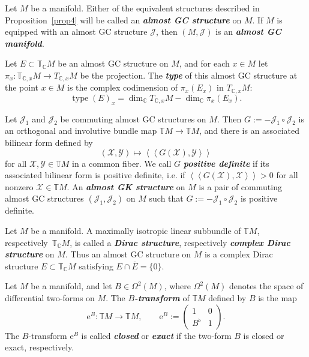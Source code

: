 \documentclass[pdftex]{sigma}
\numberwithin{equation}{section}
\newcommand{\deff}[1]{\textbf{\emph{#1}}}
\newcommand{\func}[3]{#1 \colon #2 \to #3}
\newcommand{\pont}[1]{\mathbb{T} {#1}}
\newcommand{\cpont}[1]{\mathbb{T}_{\mathbb{C}} {#1}}
\newcommand{\tang}{T}
\newcommand{\iiprod}[2]{\left\langle \! \left\langle {#1} , {#2} \right\rangle \! \right\rangle}
\begin{document}
\begin{Definition}
Let $M$ be a manifold.  Either of the equivalent structures described in Proposition~\ref{prop4} will be called an \deff{almost GC structure} on $M$.  If $M$ is equipped with an almost GC structure $\mathcal{J}$, then $(M,\mathcal{J})$ is an \deff{almost GC manifold}.

Let $E \subset \cpont{M}$ be an almost GC structure on $M$, and for each $x \in M$ let $\func{\pi_x}{\mathbb{T}_{\mathbb{C},x} M}{\tang_{\mathbb{C},x} M}$ be the projection.  The \deff{type} of this almost GC structure at the point $x \in M$ is the complex codimension of $\pi_x(E_x)$ in $\tang_{\mathbb{C},x} M$:
\[
  \operatorname{type}(E)_x
  =
  \dim_{\mathbb{C}} \tang_{\mathbb{C},x} M - \dim_{\mathbb{C}} \pi_x(E_x).
\]

Let $\mathcal{J}_1$ and $\mathcal{J}_2$ be commuting almost GC structures on $M$.  Then $G := -\mathcal{J}_1 \circ \mathcal{J}_2$ is an orthogonal and involutive bundle map $\pont{M} \to \pont{M}$, and there is an associated bilinear form def\/ined by
\[
  (\mathcal{X},\mathcal{Y}) \mapsto \iiprod{G(\mathcal{X})}{\mathcal{Y}}
\]
for all $\mathcal{X}, \mathcal{Y} \in \pont{M}$ in a common f\/iber.
We call $G$ \deff{positive definite} if its associated bilinear form is positive def\/inite, i.e. if $\iiprod{G(\mathcal{X})}{\mathcal{X}} > 0$ for all nonzero $\mathcal{X} \in \pont{M}$.
An  \deff{almost GK structure} on $M$ is a pair of commuting almost GC structures $(\mathcal{J}_1,\mathcal{J}_2)$ on $M$ such that $G := -\mathcal{J}_1 \circ \mathcal{J}_2$ is positive def\/inite.
\end{Definition}


\begin{Remark}
Let $M$ be a manifold.  A maximally isotropic linear subbundle of $\pont{M}$, respectively~$\cpont{M}$, is called a \deff{Dirac structure}, respectively \deff{complex Dirac structure} on $M$.
Thus an almost GC structure on $M$ is a complex Dirac structure $E \subset \cpont{M}$ satisfying $E \cap \overline{E} = \{0\}$.
\end{Remark}


\begin{Definition}
Let $M$ be a manifold, and let $B \in \Omega^2(M)$, where $\Omega^2(M)$ denotes the space of dif\/ferential two-forms on $M$.  The \deff{$B$-transform} of $\pont{M}$ def\/ined by $B$ is the map
\[
  \func{\mathrm{e}^{B}}{\pont{M}}{\pont{M}},
  \qquad
  \mathrm{e}^B := \begin{pmatrix} 1 & 0 \\ B^{\flat} & 1 \end{pmatrix}.
\]
The $B$-transform $\mathrm{e}^B$ is called \deff{closed} or \deff{exact} if the two-form $B$ is closed or exact, respectively.
\end{Definition}
\end{document}
